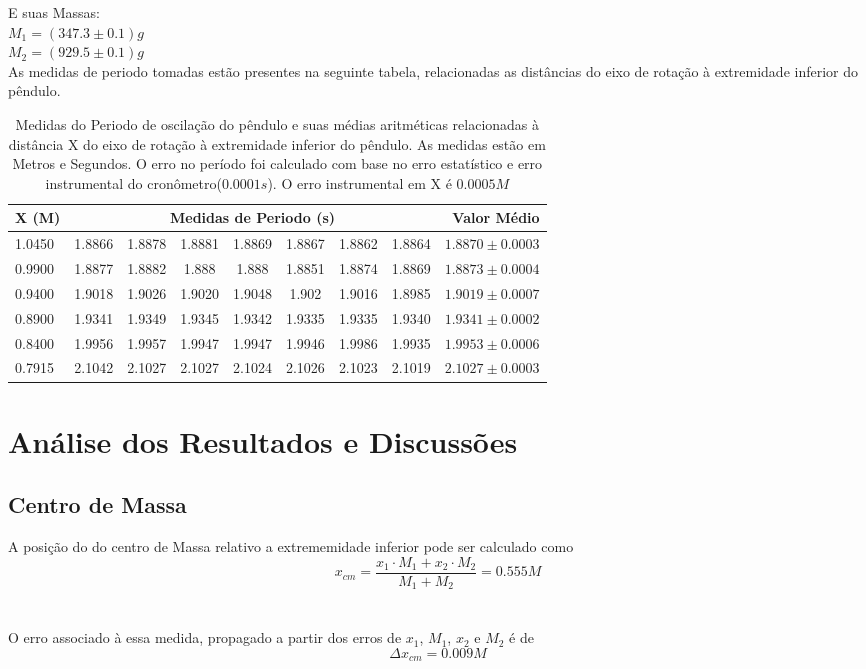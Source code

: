 \documentclass[12pt,a4paper]{article}
\begin{document}
E suas Massas:\\
$ M_1 = (347.3 \pm 0.1) g $\\
$ M_2 = (929.5 \pm 0.1) g $\\


As medidas de periodo tomadas estão presentes na seguinte tabela, relacionadas as distâncias do eixo de rotação à extremidade inferior do pêndulo. \\

\begin{table}
\def\arraystretch{1.5}
\begin{tabular}{|l| c c c c c c c|r|}
\hline 
X (M) & \multicolumn{7}{c|}{Medidas de Periodo (s)} & Valor Médio \\ 
\hline
1.0450 & 1.8866 & 1.8878 & 1.8881 & 1.8869 & 1.8867 & 1.8862 & 1.8864 & $1.8870 \pm 0.0003 $ \\
\hline
0.9900 & 1.8877 & 1.8882 & 1.888 & 1.888 & 1.8851 & 1.8874 & 1.8869 & $1.8873 \pm 0.0004 $\\
\hline
0.9400 & 1.9018 & 1.9026 & 1.9020 & 1.9048 & 1.902 & 1.9016 & 1.8985 & $1.9019 \pm 0.0007$\\
\hline
0.8900 & 1.9341 & 1.9349 & 1.9345 & 1.9342 & 1.9335 & 1.9335 & 1.9340 & $1.9341 \pm 0.0002$\\
\hline
0.8400 & 1.9956 & 1.9957 & 1.9947 & 1.9947 & 1.9946 & 1.9986 & 1.9935 & $1.9953 \pm 0.0006$\\
\hline
0.7915 & 2.1042 & 2.1027 & 2.1027 & 2.1024 & 2.1026 & 2.1023 & 2.1019 & $2.1027 \pm 0.0003 $\\
\hline
 
\end{tabular} 
\caption{Medidas do Periodo de oscilação do pêndulo e suas médias aritméticas relacionadas à distância X do eixo de rotação à extremidade inferior do pêndulo. As medidas estão em Metros e Segundos. O erro no período foi calculado com base no erro estatístico e erro instrumental do cronômetro($0.0001 s$). O erro instrumental em X é $0.0005M$}
\end{table}




\section{Análise dos Resultados e Discussões}
\subsection{Centro de Massa}
A posição do do centro de Massa relativo a extrememidade inferior pode ser calculado como\\
$$ x_{cm} = \frac{x_1 \cdot M_1 + x_2 \cdot M_2}{M_1 + M_2} = 0.555 M $$\\ \\
O erro associado à essa medida, propagado a partir dos erros de $x_1$, $M_1$, $x_2$ e $M_2$ é de $$ \Delta x_{cm} =  0.009 M $$
\end{document}
